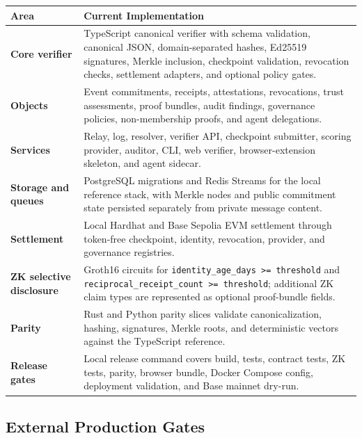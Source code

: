 \documentclass[11pt]{article}
\begin{document}
\begin{center}
\begin{tabularx}{\textwidth}{>{\bfseries}p{} X}
\toprule
Area & Current Implementation \\
\midrule
Core verifier & TypeScript canonical verifier with schema validation, canonical JSON, domain-separated hashes, Ed25519 signatures, Merkle inclusion, checkpoint validation, revocation checks, settlement adapters, and optional policy gates. \\
Objects & Event commitments, receipts, attestations, revocations, trust assessments, proof bundles, audit findings, governance policies, non-membership proofs, and agent delegations. \\
Services & Relay, log, resolver, verifier API, checkpoint submitter, scoring provider, auditor, CLI, web verifier, browser-extension skeleton, and agent sidecar. \\
Storage and queues & PostgreSQL migrations and Redis Streams for the local reference stack, with Merkle nodes and public commitment state persisted separately from private message content. \\
Settlement & Local Hardhat and Base Sepolia EVM settlement through token-free checkpoint, identity, revocation, provider, and governance registries. \\
ZK selective disclosure & Groth16 circuits for \texttt{identity\_age\_days >= threshold} and \texttt{reciprocal\_receipt\_count >= threshold}; additional ZK claim types are represented as optional proof-bundle fields. \\
Parity & Rust and Python parity slices validate canonicalization, hashing, signatures, Merkle roots, and deterministic vectors against the TypeScript reference. \\
Release gates & Local release command covers build, tests, contract tests, ZK tests, parity, browser bundle, Docker Compose config, deployment validation, and Base mainnet dry-run. \\
\bottomrule
\end{tabularx}
\end{center}

\subsection{External Production Gates}
\end{document}
